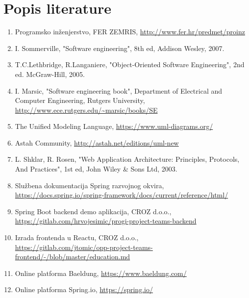 \chapter*{Popis literature}
		
		\begin{enumerate}
			
			
			\item  Programsko inženjerstvo, FER ZEMRIS, \url{http://www.fer.hr/predmet/proinz}
			
			\item  I. Sommerville, "Software engineering", 8th ed, Addison Wesley, 2007.
			
			\item  T.C.Lethbridge, R.Langaniere, "Object-Oriented Software Engineering", 2nd ed. McGraw-Hill, 2005.
			
			\item  I. Marsic, "Software engineering book", Department of Electrical and Computer Engineering, Rutgers University, \url{http://www.ece.rutgers.edu/~marsic/books/SE}
			
			\item  The Unified Modeling Language, \url{https://www.uml-diagrams.org/}
			
			\item  Astah Community, \url{http://astah.net/editions/uml-new}
			
			\item L. Shklar, R. Rosen, "Web Application Architecture: Principles, Protocols, And Practices", 1st ed, John Wiley \& Sons Ltd, 2003.
			
			\item Službena dokumentacija Spring razvojnog okvira, \url{https://docs.spring.io/spring-framework/docs/current/reference/html/}
			
			\item Spring Boot backend demo aplikacija, CROZ d.o.o., \\ \url{https://gitlab.com/hrvojesimic/progi-project-teams-backend}
			
			\item Izrada frontenda u Reactu, CROZ d.o.o., \\
			\url{https://gitlab.com/jtomic/opp-project-teams-frontend/-/blob/master/education.md}
			
			\item Online platforma Baeldung, \url{https://www.baeldung.com/}
			
			\item Online platforma Spring.io, \url{https://spring.io/}
			
		\end{enumerate}
		
		 